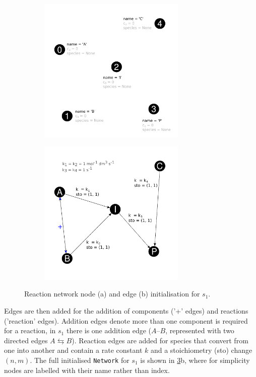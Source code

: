 \documentclass[9.5pt]{article}
\newcommand{\code}[1]{\texttt{#1}}
\begin{document}
 \begin{figure}[h!]
	\vspace{0.2cm}
	\begin{subfigure}{.5\textwidth}
		\centering
		\includegraphics[width=7cm]{figureX1}
		\label{fig::X1}
	\end{subfigure}%
	\vline
	\begin{subfigure}{.5\textwidth}
		\centering
		\includegraphics[width=7cm]{figureX2}
		\label{fig::X2}
	\end{subfigure}
	\caption{Reaction network node (a) and edge (b) initialisation for $s_1$.}
	\label{fig:network_init}
	\vspace{0.2cm}
\end{figure}

 Edges are then added for the addition of components ('+' edges) and reactions ('reaction' edges). Addition edges denote more than one component is required for a reaction, in $s_1$  there is one addition edge ($A$--$B$, represented with two directed edges $A \leftrightarrows B$). Reaction edges are added for species that convert from one into another and contain a rate constant $k$ and a stoichiometry (sto) change $(n, m)$. The full initialised \code{Network} for $s_1$ is shown in \figurename{ \ref{fig:network_init}b}, where for simplicity nodes are labelled with their name rather than index.
 
\end{document}
